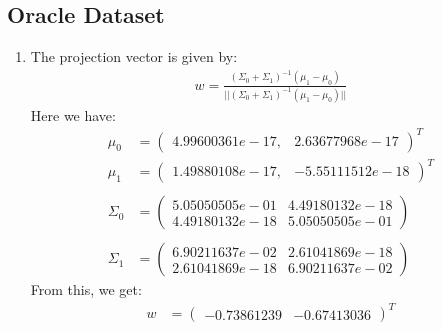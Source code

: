\documentclass[12pt]{article}
\begin{document}
\subsection*{Oracle Dataset}
\begin{enumerate}
    \item The projection vector is given by:
    \begin{align*}
        w = \frac{(\Sigma_0 + \Sigma_1)^{-1}(\mu_1 - \mu_0)}{||(\Sigma_0 + \Sigma_1)^{-1}(\mu_1 - \mu_0)||}
    \end{align*}
    Here we have:
    \begin{align*}
        \mu_0 &= \begin{pmatrix}
            4.99600361e-17, & 2.63677968e-17
        \end{pmatrix}^T \\
        \mu_1 &= \begin{pmatrix}
            1.49880108e-17, & -5.55111512e-18
        \end{pmatrix}^T \\ \\ 
        \Sigma_0 &= \begin{pmatrix}
            5.05050505e-01 & 4.49180132e-18 \\
            4.49180132e-18 & 5.05050505e-01
        \end{pmatrix} \\ \\
        \Sigma_1 &= \begin{pmatrix}
            6.90211637e-02 & 2.61041869e-18 \\
            2.61041869e-18 & 6.90211637e-02
        \end{pmatrix}
    \end{align*}
    From this, we get:
    \begin{align*}
        w &= \begin{pmatrix}
            -0.73861239 & -0.67413036
        \end{pmatrix}^T
    \end{align*}


\end{enumerate}
\end{document}
